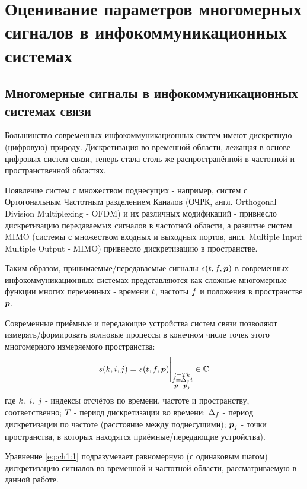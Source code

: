 \chapter{Оценивание параметров многомерных сигналов в инфокоммуникационных системах}\label{ch:ch1}

\section{Многомерные сигналы в инфокоммуникационных системах связи}\label{sec:ch1/sec1}

Большинство современных инфокоммуникационных систем имеют дискретную (цифровую) природу. Дискретизация во временной области, лежащая в основе цифровых систем связи, теперь стала столь же распространённой в частотной и пространственной областях.

Появление систем с множеством поднесущих - например, систем с Ортогональным Частотным разделением Каналов (ОЧРК, англ. Orthogonal Division Multiplexing - OFDM) и их различных модификаций - привнесло дискретизацию передаваемых сигналов в частотной области, а развитие систем MIMO (системы с множеством входных и выходных портов, англ. Multiple Input Multiple Output - MIMO) привнесло дискретизацию в пространстве.

Таким образом, принимаемые/передаваемые сигналы $s(t,f,\boldsymbol{p})$ в современных инфокоммуникационных системах представляются как сложные многомерные функции многих переменных - времени $t$, частоты $f$ и положения в пространстве $\boldsymbol{p}$.

Современные приёмные и передающие устройства систем связи позволяют измерять/формировать волновые процессы в конечном числе точек этого многомерного измеряемого пространства:
\begin{equation}
\label{eq:ch1:1}
s(\ti,\fri,\spi)=s(\ta,\fra,\spa)\at[\Bigg]{\substack{\ta=T\ti \\ f=\scs\fri \\ \spa=\bm{p}_{\spi} }}\in\compl
\end{equation}
где $k$, $i$, $j$ - индексы отсчётов по времени, частоте и пространству, соответственно; $T$ - период дискретизации во времени; $\Delta_f$ - период дискретизации по частоте (расстояние между поднесущими); $\boldsymbol{p}_{j}$ - точки пространства, в которых находятся приёмные/передающие устройства).

Уравнение \eqref{eq:ch1:1} подразумевает равномерную (с одинаковым шагом) дискретизацию сигналов во временной и частотной области, рассматриваемую в данной работе.

